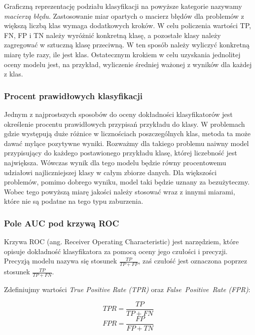 \documentclass[a4paper, twoside, 11pt, openright]{article}
\begin{document}
Graficzną reprezentację podziału klasyfikacji na powyższe kategorie nazywamy \textit{macierzą błędu}. Zastosowanie miar opartych o macierz błędów dla problemów z większą liczbą klas wymaga dodatkowych kroków. W celu policzenia wartości TP, FN, FP i TN należy wyróżnić konkretną klasę, a pozostałe klasy należy zagregować w sztuczną klasę przeciwną. W ten sposób należy wyliczyć konkretną miarę tyle razy, ile jest klas. Ostatecznym krokiem w celu uzyskania jednolitej oceny modelu jest, na przykład, wyliczenie średniej ważonej z wyników dla każdej z klas.


\subsubsection{Procent prawidłowych klasyfikacji}

Jednym z najprostszych sposobów do oceny dokładności klasyfikatorów jest określenie procentu prawidłowych przypisań przykładu do klasy. W problemach gdzie występują duże różnice w licznościach poszczególnych klas, metoda ta może dawać mylące pozytywne wyniki. Rozważmy dla takiego problemu naiwny model przypisujący do każdego postawionego przykładu klasę, której liczebność jest największa. Wówczas wynik dla tego modelu będzie równy procentowemu udziałowi najliczniejszej klasy w całym zbiorze danych. Dla większości problemów, pomimo dobrego wyniku, model taki będzie uznany za bezużyteczny. Wobec tego powyższą miarę jakości należy stosować wraz z innymi miarami, które nie są podatne na tego typu zaburzenia.

\subsubsection{Pole AUC pod krzywą ROC}

Krzywa ROC (ang. Receiver Operating Characteristic)\cite{roc} jest narzędziem, które opisuje dokładność klasyfikatora za pomocą oceny jego czułości i precyzji. Precyzją modelu nazywa się stosunek $\frac{TP}{TP+FP}$, zaś czułość jest oznaczona poprzez stosunek $\frac{TP}{TP+FN}$.

\bigskip

Zdefiniujmy wartości \textit{True Positive Rate (TPR)} oraz \textit{False\ Positive\ Rate (FPR)}:


\begin{equation}
TPR = \frac{TP}{TP+FN}
\end{equation}
\begin{equation}
FPR = \frac{FP}{FP+TN}
\end{equation}
\end{document}
